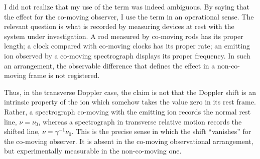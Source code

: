 \documentclass[submitted,11pt]{article}
\begin{document}
\begin{reply}



I did not realize that my use of the term  was indeed ambiguous. By saying that the effect  for the co-moving observer, I use the term in an operational sense. The relevant question is what is recorded by measuring devices at rest with the system under investigation. A rod measured by co-moving rods has its proper length; a clock compared with co-moving clocks has its proper rate; an emitting ion observed by a co-moving spectrograph displays its proper frequency. In such an arrangement, the observable difference that defines the effect in a non-co-moving frame is not registered.

Thus, in the transverse Doppler case, the claim is not that the Doppler shift is an intrinsic property of the ion which somehow takes the value zero in its rest frame. Rather, a spectrograph co-moving with the emitting ion records the normal rest line, \(\nu=\nu_0\), whereas a spectrograph in transverse relative motion records the shifted line, \(\nu=\gamma^{-1}\nu_0\). This is the precise sense in which the shift “vanishes” for the co-moving observer. It is absent in the co-moving observational arrangement, but experimentally measurable in the non-co-moving one.

\end{reply}
\end{document}
